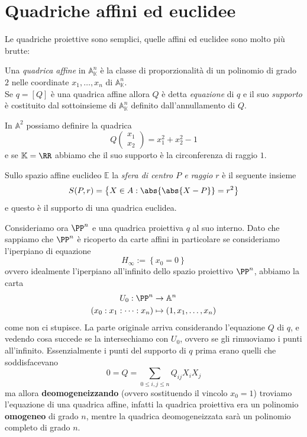 \documentclass[11pt]{scrartcl}
\renewcommand{\AA}{\mathbb{A}}
\newcommand{\KK}{\mathbb{K}}
\begin{document}
	\newpage
	
	\section{Quadriche affini ed euclidee}
	
	Le quadriche proiettive sono semplici, quelle affini ed euclidee sono molto più brutte:
	\begin{definition}
		Una \textit{quadrica affine} in $\AA_\KK^n$ è la classe di proporzionalità di un polinomio di grado $2$ nelle coordinate $x_1,\dots,x_n$ di $\AA^n_\KK$. \\
		Se $q=[Q]$ è una quadrica affine allora $Q$ è detta \textit{equazione} di $q$ e il suo \textit{supporto} è costituito dal sottoinsieme di $\AA_\KK^n$ definito dall'annullamento di $Q$.
	\end{definition}
	\begin{example}
		In $\AA^2$ possiamo definire la quadrica 
		$$
		Q
		\begin{pmatrix}
			x_1 \\
			x_2
		\end{pmatrix}=x_1^2+x_2^2-1
		$$
		e se $\KK=\RR$ abbiamo che il suo supporto è la circonferenza di raggio $1$.
	\end{example}
	\begin{example}
		Sullo spazio affine euclideo $\mathbb{E}$ la \textit{sfera di centro $P$ e raggio $r$} è il seguente insieme
		$$S(P,r)=\left\{X\in A:\abs{\abs{X-P}}=r^2\right\}$$
		e questo è il supporto di una quadrica euclidea.
	\end{example}
	Consideriamo ora $\PP^n$ e una quadrica proiettiva $q$ al suo interno. Dato che sappiamo che $\PP^n$ è ricoperto da carte affini in particolare se consideriamo l'iperpiano di equazione
	$$H_\infty:=\left\{x_0=0\right\}$$
	ovvero idealmente l'iperpiano all'infinito dello spazio proiettivo $\PP^n$, abbiamo la carta 
	\begin{align*}
		U_0:\PP^n & \to \AA^n \\
		(x_0:x_1:\dots: x_n) & \mapsto (1,x_1,\dots,x_n)
	\end{align*}
	come non ci stupisce. La parte originale arriva considerando l'equazione $Q$ di $q$, e vedendo cosa succede se la intersechiamo con $U_0$, ovvero se gli rimuoviamo i punti all'infinito. Essenzialmente i punti del supporto di $q$ prima erano quelli che soddisfacevano
	$$0=Q=\sum_{0\le i,j\le n}Q_{ij}X_iX_j$$
	ma allora \textbf{deomogeneizzando} (ovvero sostituendo il vincolo $x_0=1$) troviamo l'equazione di una quadrica affine, infatti la quadrica proiettiva era un polinomio \textbf{omogeneo} di grado $n$, mentre la quadrica deomogeneizzata sarà un polinomio completo di grado $n$.
\end{document}
